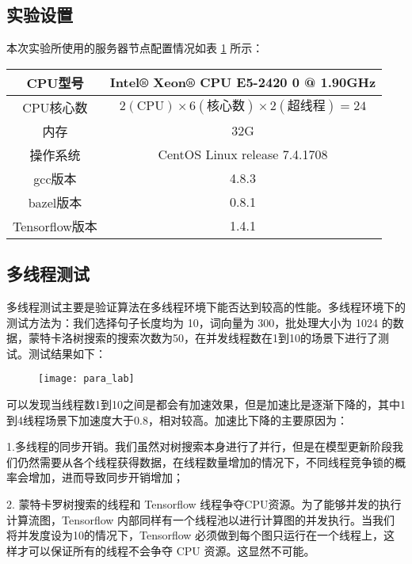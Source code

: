 \subsection{实验设置}
本次实验所使用的服务器节点配置情况如表 \ref{tab:exp_machine} 所示：

\begin{table}[H]
    \label{tab:exp_machine}
    \centering
    \footnotesize%
    \setlength{\tabcolsep}{4pt}%
    \renewcommand{\arraystretch}{1.2}%
    \begin{tabular}{|c|c|}
        \hline
        CPU型号 & Intel® Xeon® CPU E5-2420 0 @ 1.90GHz  \\
        \hline
        CPU核心数 & $2(\text{CPU}) \times 6(\text{核心数}) \times 2(\text{超线程}) = 24$ \\
        \hline
        内存 & 32G \\
        \hline
        操作系统 & CentOS Linux release 7.4.1708 \\
        \hline
        gcc版本 & 4.8.3\\
        \hline
        bazel版本 & 0.8.1 \\
        \hline
        Tensorflow版本 & 1.4.1\\
        \hline
    \end{tabular}{}
\end{table}

\subsection{多线程测试}
多线程测试主要是验证算法在多线程环境下能否达到较高的性能。多线程环境下的测试方法为：我们选择句子长度均为 10，词向量为 300，批处理大小为 1024 的数据，蒙特卡洛树搜索的搜索次数为50，在并发线程数在1到10的场景下进行了测试。测试结果如下：
\begin{figure}[!htbp]
    \centering
    \texttt{[image: para\_lab]}
    \label{fig:para_lab}
\end{figure}
可以发现当线程数1到10之间是都会有加速效果，但是加速比是逐渐下降的，其中1到4线程场景下加速度大于0.8，相对较高。加速比下降的主要原因为：

1.多线程的同步开销。我们虽然对树搜索本身进行了并行，但是在模型更新阶段我们仍然需要从各个线程获得数据，在线程数量增加的情况下，不同线程竞争锁的概率会增加，进而导致同步开销增加；

2. 蒙特卡罗树搜索的线程和 Tensorflow 线程争夺CPU资源。为了能够并发的执行计算流图，Tensorflow 内部同样有一个线程池以进行计算图的并发执行。当我们将并发度设为10的情况下，Tensorflow 必须做到每个图只运行在一个线程上，这样才可以保证所有的线程不会争夺 CPU 资源。这显然不可能。

